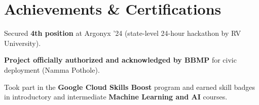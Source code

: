 \documentclass[letterpaper,11pt]{article}
\begin{document}
\section{Achievements \& Certifications}
\begin{itemize}[itemsep=0pt, parsep=0pt, topsep=0pt]
  \small{
    \item Secured \textbf{4th position} at Argonyx ’24 (state-level 24-hour hackathon by RV University).
    \item \textbf{Project officially authorized and acknowledged by BBMP} for civic deployment (Namma Pothole).
    \item Took part in the \textbf{Google Cloud Skills Boost} program and earned skill badges in introductory and intermediate \textbf{Machine Learning and AI} courses.
  }
\end{itemize}



\end{document}
